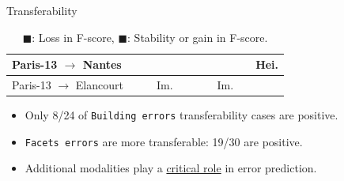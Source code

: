 \documentclass[10pt, export]{beamer}
\begin{document}
\begin{frame}{Transferability}
{\begin{table}
\begin{center}
\begin{tabular}{| x{1.5cm}| x{.4cm} | x{.4cm} | x{.4cm} | x{.4cm} | x{.4cm} | x{.4cm} | x{.4cm} | x{.4cm} | x{.4cm} |}
                            Paris-13 $\rightarrow$ Nantes  & & &  & & & & &  &  Hei.\\
                            \hline
                            Paris-13 $\rightarrow$ Elancourt & & & Im. & & & & Im. &  & \\
                            \hline
                        \end{tabular}
                        \caption{\footnotesize \textcolor{IGNRed}{$\blacksquare$}: Loss in F-score, \textcolor{IGNGreen}{$\blacksquare$}: Stability or gain in F-score.}
                    \end{center}
                \end{table}
                \begin{itemize}[label=$\blacktriangleright$, font=\color{IGNGreen}]
                    \item<3-> \footnotesize Only 8/24 of \texttt{Building errors} transferability cases are \textcolor{IGNGreen}{positive}.
                    \item<4-> \footnotesize \texttt{Facets errors} are more transferable: 19/30 are \textcolor{IGNGreen}{positive}.
                    \item<5-> \footnotesize Additional modalities play a \underline{critical role} in error prediction.
                \end{itemize}
            }
        \end{frame}
\end{document}
